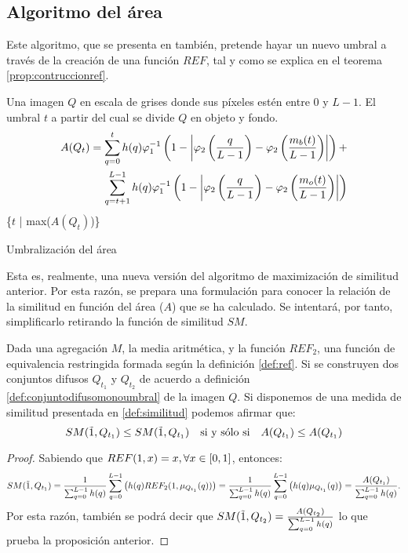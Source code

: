 \documentclass[main]{subfiles}
\begin{document}
\subsection{Algoritmo del área}

Este algoritmo, que se presenta en \cite{art:barrenechea} también, pretende hayar un nuevo umbral a través de la creación de una función $REF$, tal y como se explica en el teorema \ref{prop:contruccionref}.

\begin{algorithm}
\begin{algorithmic}[1]
\REQUIRE Una imagen $Q$ en escala de grises donde sus píxeles estén entre $0$ y $L-1$.
\ENSURE El umbral $t$ a partir del cual se divide $Q$ en objeto y fondo.
\STATE \begin{equation*}\begin{split}
A(Q_t)= \sum_{q=0}^{t} h(q)\varphi_1^{-1}\left(1-\left\vert\varphi_2\left(\frac{q}{L-1}\right)-\varphi_2\left(\frac{m_b(t)}{L-1}\right)\right\vert\right) + \\ \sum_{q=t+1}^{L-1} h(q)\varphi_1^{-1}\left(1-\left\vert\varphi_2\left(\frac{q}{L-1}\right)-\varphi_2\left(\frac{m_o(t)}{L-1}\right)\right\vert\right)
\end{split}\end{equation*}
\ENDFOR
\RETURN \{$t$ | max($A(Q_t)$)\}
\end{algorithmic}
\caption{Umbralización del área}\label{alg:algoritmo2}
\end{algorithm}

Esta es, realmente, una nueva versión del algoritmo de maximización de similitud anterior. Por esta razón, se prepara una formulación para conocer la relación de la similitud en función del área ($A$) que se ha calculado. Se intentará, por tanto, simplificarlo retirando la función de similitud $SM$.
\begin{proposition}
Dada una agregación $M$, la media aritmética, y la función $REF_2$, una función de equivalencia restringida formada según la definición \ref{def:ref}. Si se construyen dos conjuntos difusos $Q_{t_1}$ y $Q_{t_2}$ de acuerdo a definición \ref{def:conjuntodifusomonoumbral} de la imagen $Q$. Si disponemos de una medida de similitud presentada en \ref{def:similitud} podemos afirmar que:
$$SM(\tilda1, Q_{t_1})\leq SM(\tilda1, Q_{t_1})\quad \text{si y sólo si}\quad A(Q_{t_1})\leq A(Q_{t_1})$$
\end{proposition}
\begin{proof}
Sabiendo que $REF(1,x)=x, \forall x\in[0,1]$, entonces:
$$SM(\tilda1, Q_{t_1})
= \frac{1}{\sum_{q=0}^{L-1}h(q)}\sum_{q=0}^{L-1}\left( h(q)REF_2(1, \mu_{Q_{t_1}}(q))\right)
= \frac{1}{\sum_{q=0}^{L-1}h(q)}\sum_{q=0}^{L-1}\left( h(q)\mu_{Q_{t_1}}(q)\right)
= \frac{A(Q_{t_1})}{\sum_{q=0}^{L-1}h(q)}.$$
Por esta razón, también se podrá decir que $SM(\tilda1, Q_{t_2}) = \frac{A(Q_{t_2})}{\sum_{q=0}^{L-1}h(q)}$ lo que prueba la proposición anterior.
\end{proof}
\end{document}
